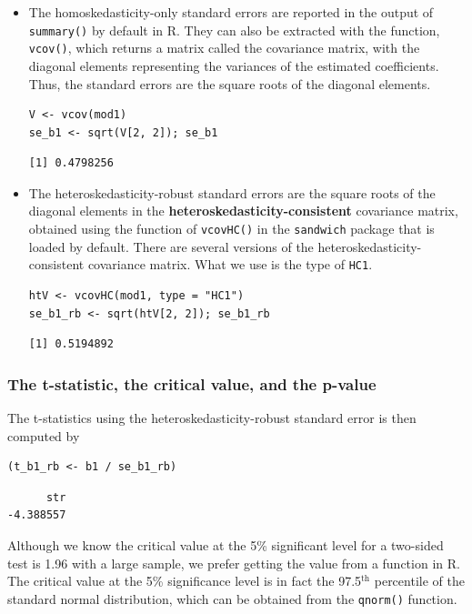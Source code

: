\documentclass[11pt]{article}
\begin{document}
\begin{itemize}
\item The homoskedasticity-only standard errors are reported in the output
of \texttt{summary()} by default in R. They can also be extracted with the
function, \texttt{vcov()}, which returns a matrix called the covariance
matrix, with the diagonal elements representing the variances of the
estimated coefficients. Thus, the standard errors are the square
roots of the diagonal elements.

\begin{verbatim}
V <- vcov(mod1)
se_b1 <- sqrt(V[2, 2]); se_b1
\end{verbatim}

\begin{verbatim}
[1] 0.4798256
\end{verbatim}

\item The heteroskedasticity-robust standard errors are the square roots
of the diagonal elements in the \textbf{heteroskedasticity-consistent}
covariance matrix, obtained using the function of \texttt{vcovHC()} in
the \texttt{sandwich} package that is loaded by default. There are several
versions of the heteroskedasticity-consistent covariance
matrix. What we use is the type of \texttt{HC1}.

\begin{verbatim}
htV <- vcovHC(mod1, type = "HC1")
se_b1_rb <- sqrt(htV[2, 2]); se_b1_rb
\end{verbatim}

\begin{verbatim}
[1] 0.5194892
\end{verbatim}
\end{itemize}

\subsubsection*{The t-statistic, the critical value, and the p-value}
\label{sec:org7298d2d}

The t-statistics using the heteroskedasticity-robust standard error
is then computed by
\begin{verbatim}
(t_b1_rb <- b1 / se_b1_rb)
\end{verbatim}

\begin{verbatim}
      str
-4.388557
\end{verbatim}

Although we know the critical value at the 5\% significant level for a
two-sided test is 1.96 with a large sample, we prefer getting the
value from a function in R. The critical value at the 5\% significance
level is in fact the 97.5\(^{\text{th}}\) percentile of the standard normal
distribution, which can be obtained from the \texttt{qnorm()} function.
\end{document}
